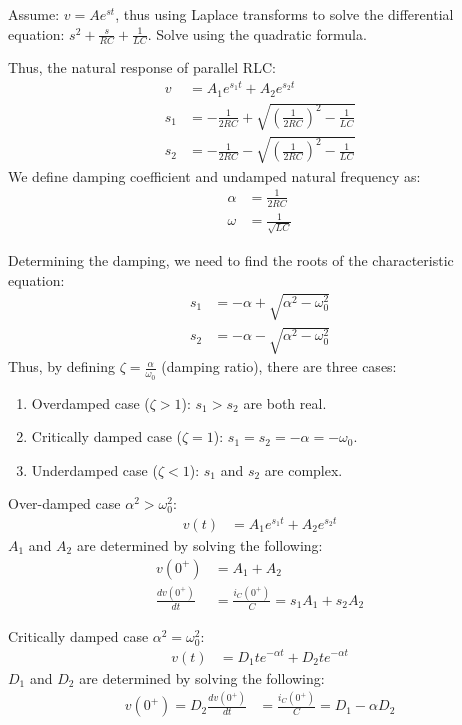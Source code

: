 Assume: $v = Ae^{st}$, thus using Laplace transforms to solve the differential equation: $s^2 + \frac{s}{RC} + \frac{1}{LC}$. Solve using the quadratic formula.

Thus, the natural response of parallel RLC:
\begin{align}
  v &= A_1 e^{s_1 t} + A_2 e^{s_2 t} \\
  s_1 &= -\frac{1}{2RC} + \sqrt{(\frac{1}{2RC})^2 - \frac{1}{LC}} \\
  s_2 &= -\frac{1}{2RC} - \sqrt{(\frac{1}{2RC})^2 - \frac{1}{LC}}
\end{align}
We define damping coefficient and undamped natural frequency as:
\begin{align}
  \alpha &= \frac{1}{2RC} \\
  \omega &= \frac{1}{\sqrt{LC}}
\end{align}

Determining the damping, we need to find the roots of the characteristic equation:
\begin{align}
  s_1 &= -\alpha + \sqrt{\alpha^2 - \omega_0^2} \\
  s_2 &= -\alpha - \sqrt{\alpha^2 - \omega_0^2}
\end{align}
Thus, by defining $\zeta = \frac{\alpha}{\omega_0}$ (damping ratio), there are three cases:
\begin{enumerate}
  \item Overdamped case ($\zeta > 1$): $s_1 > s_2$ are both real.
  \item Critically damped case ($\zeta = 1$): $s_1 = s_2 = -\alpha = -\omega_0$.
  \item Underdamped case ($\zeta < 1$): $s_1$ and $s_2$ are complex.
\end{enumerate}

Over-damped case $\alpha^2 > \omega_0^2$:
\begin{align}
  v(t) &= A_1 e^{s_1t} + A_2 e^{s_2t}
\end{align}
$A_1$ and $A_2$ are determined by solving the following:
\begin{align}
  v(0^+) &= A_1 + A_2 \\
  \frac{dv(0^+)}{dt} &= \frac{i_C(0^+)}{C} = s_1 A_1 + s_2 A_2
\end{align}

Critically damped case $\alpha^2 = \omega_0^2$:
\begin{align}
  v(t) &= D_1 t e^{-\alpha t} + D_2 t e^{-\alpha t}
\end{align}
$D_1$ and $D_2$ are determined by solving the following:
\begin{align}
  v(0^+) = D_2
  \frac{dv(0^+)}{dt} &= \frac{i_C(0^+)}{C} = D_1 - \alpha D_2
\end{align}

